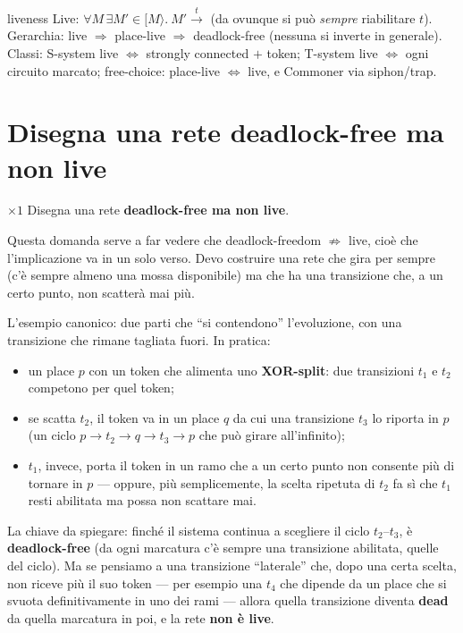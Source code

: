 \begin{puntochiave}{liveness}
Live: $\forall M\,\exists M'\in[M\rangle.\ M'\xrightarrow{t}$ (da ovunque si può \emph{sempre} riabilitare $t$). Gerarchia: live $\Rightarrow$ place-live $\Rightarrow$ deadlock-free (nessuna si inverte in generale). Classi: S-system live $\iff$ strongly connected $+$ token; T-system live $\iff$ ogni circuito marcato; free-choice: place-live $\iff$ live, e Commoner via siphon/trap.
\end{puntochiave}

\section{Disegna una rete deadlock-free ma non live}

\begin{domanda}{$\times 1$}
Disegna una rete \textbf{deadlock-free ma non live}.
\end{domanda}

Questa domanda serve a far vedere che deadlock-freedom $\not\Rightarrow$ live, cioè che l'implicazione va in un solo verso. Devo costruire una rete che gira per sempre (c'è sempre almeno una mossa disponibile) ma che ha una transizione che, a un certo punto, non scatterà mai più.

L'esempio canonico: due parti che ``si contendono'' l'evoluzione, con una transizione che rimane tagliata fuori. In pratica:

\begin{itemize}
  \item un place $p$ con un token che alimenta uno \textbf{XOR-split}: due transizioni $t_1$ e $t_2$ competono per quel token;
  \item se scatta $t_2$, il token va in un place $q$ da cui una transizione $t_3$ lo riporta in $p$ (un ciclo $p \to t_2 \to q \to t_3 \to p$ che può girare all'infinito);
  \item $t_1$, invece, porta il token in un ramo che a un certo punto non consente più di tornare in $p$ — oppure, più semplicemente, la scelta ripetuta di $t_2$ fa sì che $t_1$ resti abilitata ma possa non scattare mai.
\end{itemize}

La chiave da spiegare: finché il sistema continua a scegliere il ciclo $t_2$–$t_3$, è \textbf{deadlock-free} (da ogni marcatura c'è sempre una transizione abilitata, quelle del ciclo). Ma se pensiamo a una transizione ``laterale'' che, dopo una certa scelta, non riceve più il suo token — per esempio una $t_4$ che dipende da un place che si svuota definitivamente in uno dei rami — allora quella transizione diventa \textbf{dead} da quella marcatura in poi, e la rete \textbf{non è live}.

